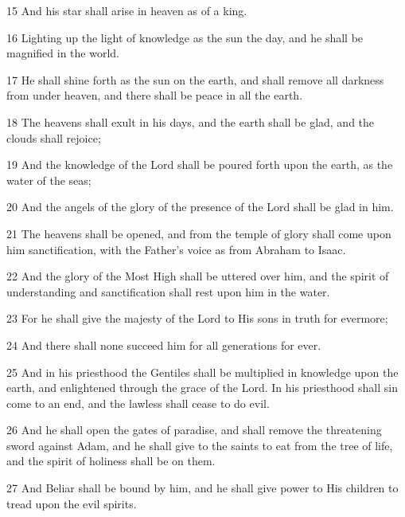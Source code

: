 \par 15 And his star shall arise in heaven as of a king.

\par 16 Lighting up the light of knowledge as the sun the day, and he shall be magnified in the world.

\par 17 He shall shine forth as the sun on the earth, and shall remove all darkness from under heaven, and there shall be peace in all the earth.

\par 18 The heavens shall exult in his days, and the earth shall be glad, and the clouds shall rejoice;

\par 19 And the knowledge of the Lord shall be poured forth upon the earth, as the water of the seas;

\par 20 And the angels of the glory of the presence of the Lord shall be glad in him.

\par 21 The heavens shall be opened, and from the temple of glory shall come upon him sanctification, with the Father's voice as from Abraham to Isaac.

\par 22 And the glory of the Most High shall be uttered over him, and the spirit of understanding and sanctification shall rest upon him in the water.

\par 23 For he shall give the majesty of the Lord to His sons in truth for evermore;

\par 24 And there shall none succeed him for all generations for ever.

\par 25 And in his priesthood the Gentiles shall be multiplied in knowledge upon the earth, and enlightened through the grace of the Lord. In his priesthood shall sin come to an end, and the lawless shall cease to do evil.

\par 26 And he shall open the gates of paradise, and shall remove the threatening sword against Adam, and he shall give to the saints to eat from the tree of life, and the spirit of holiness shall be on them.

\par 27 And Beliar shall be bound by him, and he shall give power to His children to tread upon the evil spirits.

